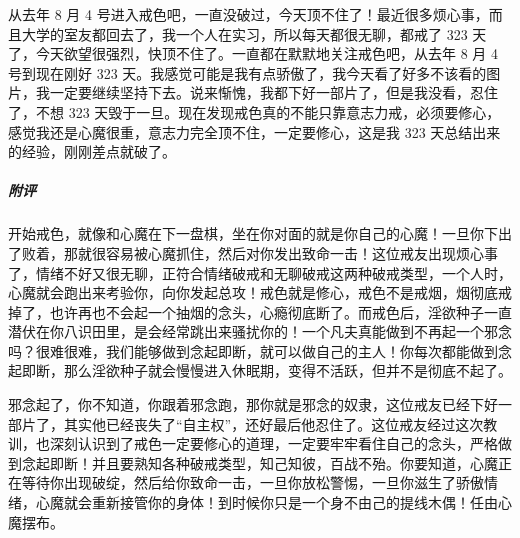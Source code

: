 \begin{case}
    从去年 8 月 4 号进入戒色吧，一直没破过，今天顶不住了！最近很多烦心事，而且大学的室友都回去了，我一个人在实习，所以每天都很无聊，都戒了 323 天了，今天欲望很强烈，快顶不住了。一直都在默默地关注戒色吧，从去年 8 月 4 号到现在刚好 323 天。我感觉可能是我有点骄傲了，我今天看了好多不该看的图片，我一定要继续坚持下去。说来惭愧，我都下好一部片了，但是我没看，忍住了，不想 323 天毁于一旦。现在发现戒色真的不能只靠意志力戒，必须要修心，感觉我还是心魔很重，意志力完全顶不住，一定要修心，这是我 323 天总结出来的经验，刚刚差点就破了。
    \subparagraph{附评} 开始戒色，就像和心魔在下一盘棋，坐在你对面的就是你自己的心魔！一旦你下出了败着，那就很容易被心魔抓住，然后对你发出致命一击！这位戒友出现烦心事了，情绪不好又很无聊，正符合情绪破戒和无聊破戒这两种破戒类型，一个人时，心魔就会跑出来考验你，向你发起总攻！戒色就是修心，戒色不是戒烟，烟彻底戒掉了，也许再也不会起一个抽烟的念头，心瘾彻底断了。而戒色后，淫欲种子一直潜伏在你八识田里，是会经常跳出来骚扰你的！一个凡夫真能做到不再起一个邪念吗？很难很难，我们能够做到念起即断，就可以做自己的主人！你每次都能做到念起即断，那么淫欲种子就会慢慢进入休眠期，变得不活跃，但并不是彻底不起了。

    邪念起了，你不知道，你跟着邪念跑，那你就是邪念的奴隶，这位戒友已经下好一部片了，其实他已经丧失了“自主权”，还好最后他忍住了。这位戒友经过这次教训，也深刻认识到了戒色一定要修心的道理，一定要牢牢看住自己的念头，严格做到念起即断！并且要熟知各种破戒类型，知己知彼，百战不殆。你要知道，心魔正在等待你出现破绽，然后给你致命一击，一旦你放松警惕，一旦你滋生了骄傲情绪，心魔就会重新接管你的身体！到时候你只是一个身不由己的提线木偶！任由心魔摆布。
\end{case}

